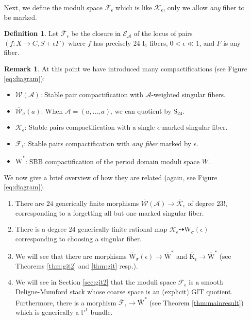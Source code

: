 \documentclass[11pt]{amsart}
\theoremstyle{definition}
\newtheorem{definition}[theorem]{Definition}
\newtheorem{remark}[theorem]{Remark}
\theoremstyle{remark}
\newcommand{\calA}{\mathcal A}
\newcommand{\calW}{\mathcal W}
\newcommand{\sbb}{\overline{\mathrm{W}}^{*}}
\newcommand{\ka}{\overline{\calW}(\calA)}
\newcommand{\ska}{\overline{\calW}_\sigma(a)}
\newcommand{\ke}{\overline{\mathcal{K}}_{\epsilon}}
\newcommand{\me}{\overline{\mathrm{K}}_\epsilon}
\newcommand{\fe}{\overline{\mathcal{F}}_\epsilon}
\newcommand{\kepsiloncoarse}{{\overline{\mathrm{W}}}_\sigma(\epsilon)}
\newcommand{\km}{\fe}
\begin{document}
	
	
	Next, we define the moduli space $\km$ which is like $\ke$, only we allow \emph{any} fiber to be marked.
	
	
	\begin{definition}\label{def:modulispace} Let $\km$ be the closure in $\mathcal{E}_{\calA}$ of the locus of pairs $(f: X \to C, S + \epsilon F)$ where $f$ has precisely 24 $\mathrm{I}_1$ fibers, $0 < \epsilon \ll 1$, and $F$ is any fiber. \end{definition}
	
	
	
	
	
	\begin{remark}\label{rem:variousmoduli} At this point we have introduced many compactifications (see Figure \ref{eq:diagram}):
		\begin{itemize}\setlength\itemsep{.5em}
			\item $\ka$: Stable pair compactification with $\calA$-weighted singular fibers.
			\item $\ska$: When $\calA = (a, \dots, a)$, we can quotient by $\mathrm{S}_{24}$. 
			\item $\ke$: Stable pairs compactification with a single $\epsilon$-marked singular fiber.
			\item $\km$: Stable pairs compactification with \emph{any fiber} marked by $\epsilon$.
			\item $\sbb$: SBB compactification of the period domain moduli space $W$.
			
		\end{itemize}
		
		We now give a brief overview of how they are related (again, see Figure \ref{eq:diagram}).
		
		\begin{enumerate}
			
			
			\item There are $24$ generically finite morphisms $\ka \to \ke$ of degree $23!$, corresponding to a forgetting all but one marked singular fiber.
			
			\item There is a degree $24$ generically finite rational map $\ke \dashrightarrow \kepsiloncoarse$ corresponding to choosing a singular fiber. 
			
			
			\item We will see that there are morphisms $\kepsiloncoarse \to \sbb$ and $\me \to \sbb $ (see Theorems \ref{thm:git2} and \ref{thm:git} resp.).
			
			
			\item We will see in Section \ref{sec:git2} that the moduli space $\km$ is a smooth Deligne-Mumford stack whose coarse space is an (explicit) GIT quotient. Furthermore, there is a morphism $\km \to \sbb$ (see Theorem \ref{thm:mainresult}) which is generically a $\mathbb{P}^1$ bundle.
			
		\end{enumerate}
		
	\end{remark}
	
\end{document}
